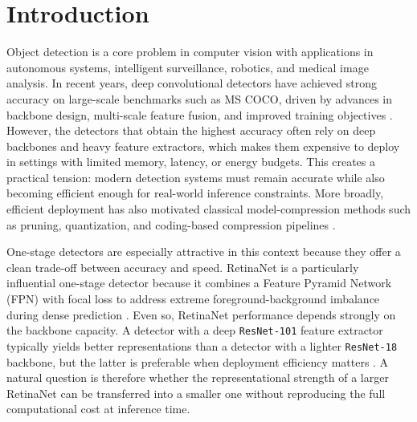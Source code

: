 \chapter{Introduction}

Object detection is a core problem in computer vision with applications in autonomous systems, intelligent surveillance, robotics, and medical image analysis. In recent years, deep convolutional detectors have achieved strong accuracy on large-scale benchmarks such as MS COCO, driven by advances in backbone design, multi-scale feature fusion, and improved training objectives \cite{lin2014coco,he2016resnet,lin2017fpn,lin2017focal}. However, the detectors that obtain the highest accuracy often rely on deep backbones and heavy feature extractors, which makes them expensive to deploy in settings with limited memory, latency, or energy budgets. This creates a practical tension: modern detection systems must remain accurate while also becoming efficient enough for real-world inference constraints. More broadly, efficient deployment has also motivated classical model-compression methods such as pruning, quantization, and coding-based compression pipelines \cite{han2015learning,hubara2016quantized,han2016deep}.

One-stage detectors are especially attractive in this context because they offer a clean trade-off between accuracy and speed. RetinaNet is a particularly influential one-stage detector because it combines a Feature Pyramid Network (FPN) with focal loss to address extreme foreground-background imbalance during dense prediction \cite{lin2017fpn,lin2017focal}. Even so, RetinaNet performance depends strongly on the backbone capacity. A detector with a deep \texttt{ResNet-101} feature extractor typically yields better representations than a detector with a lighter \texttt{ResNet-18} backbone, but the latter is preferable when deployment efficiency matters \cite{he2016resnet}. A natural question is therefore whether the representational strength of a larger RetinaNet can be transferred into a smaller one without reproducing the full computational cost at inference time.


